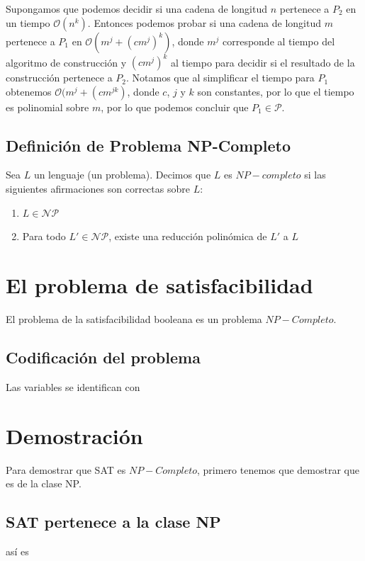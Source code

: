 \documentclass[a4paper]{article}
\begin{document}
Supongamos que podemos decidir si una cadena de longitud $n$ pertenece a $P_2$
en un tiempo $\mathcal{O}(n^{k})$. Entonces podemos probar si una cadena de
longitud $m$ pertenece a $P_1$ en $\mathcal{O}(m^j + (cm^j)^k)$,
donde $m^j$ corresponde al tiempo del algoritmo de construcción y $(cm^j)^k$ al
tiempo para decidir si el resultado de la construcción pertenece a $P_2$.
Notamos que al simplificar el tiempo para $P_1$ obtenemos
$\mathcal{O}(m^j + (cm^{jk})$, donde $c$, $j$ y $k$ son constantes, por lo que
el tiempo es polinomial sobre $m$, por lo que podemos concluir que $P_1 \in \mathcal{P}$.

\subsection{Definición de Problema NP-Completo}
Sea $L$ un lenguaje (un problema). Decimos que $L$ es $NP-completo$ si las
siguientes afirmaciones son correctas sobre $L$:
\begin{enumerate}
  \item $L \in \mathcal{NP}$
  \item Para todo $L' \in \mathcal{NP}$, existe una reducción polinómica de $L'$ a $L$
\end{enumerate}


\section{El problema de satisfacibilidad}
El problema de la satisfacibilidad booleana es un problema $NP-Completo$\cite{cook1971complexity}.



\subsection{Codificación del problema}

Las variables se identifican con

\section{Demostración}
Para demostrar que SAT es $NP-Completo$, primero tenemos que demostrar que es de la clase NP.

\subsection{SAT pertenece a la clase NP}
así es
\end{document}
